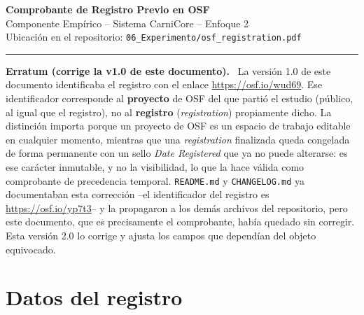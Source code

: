 \documentclass[11pt,a4paper]{article}
\newenvironment{notaerratum}
  {\begin{framed}\small\noindent\textbf{\color{alerta}Erratum (corrige la v1.0 de este documento).}~}
  {\end{framed}}
\begin{document}
\begin{center}
    {\Large\bfseries Comprobante de Registro Previo en OSF}\\[0.3em]
    {\large Componente Empírico -- Sistema CarniCore -- Enfoque 2}\\[0.6em]
    {\small Ubicación en el repositorio: \texttt{06\_Experimento/osf\_registration.pdf}}
\end{center}

\vspace{0.5em}
\hrule
\vspace{1em}

\begin{notaerratum}
La versión 1.0 de este documento identificaba el registro con el enlace
\url{https://osf.io/wud69}. Ese identificador corresponde al \textbf{proyecto}
de OSF del que partió el estudio (público, al igual que el registro), no al
\textbf{registro} (\textit{registration}) propiamente dicho. La distinción
importa porque un proyecto de OSF es un espacio de trabajo editable en
cualquier momento, mientras que una \textit{registration} finalizada queda
congelada de forma permanente con un sello \textit{Date Registered} que ya no
puede alterarse: es ese carácter inmutable, y no la visibilidad, lo que la
hace válida como comprobante de precedencia temporal. \texttt{README.md} y
\texttt{CHANGELOG.md} ya documentaban esta corrección --el identificador del
registro es \url{https://osf.io/yp7t3}-- y la propagaron a los demás archivos
del repositorio, pero este documento, que es precisamente el comprobante,
había quedado sin corregir. Esta versión 2.0 lo corrige y ajusta los campos
que dependían del objeto equivocado.
\end{notaerratum}

\section*{Datos del registro}
\end{document}
